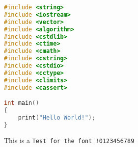 


\def\HWTITLE{Assignment 7}
\def\COURSECODE{CS 225: Data Structures}
\def\AUTHOR{Group D1}



\makeMyTitle

\thispagestyle{firstPage}

\begin{questions}


\end{questions}

\begin{lstlisting}[language=C]
#include <string>
#include <iostream>
#include <vector>   
#include <algorithm>
#include <cstdlib>
#include <ctime>
#include <cmath>
#include <cstring>
#include <cstdio>
#include <cctype>
#include <climits>
#include <cassert>

int main()
{
    print("Hello World!");
}

\end{lstlisting}

This is a \texttt{Test for the font !0123456789}

